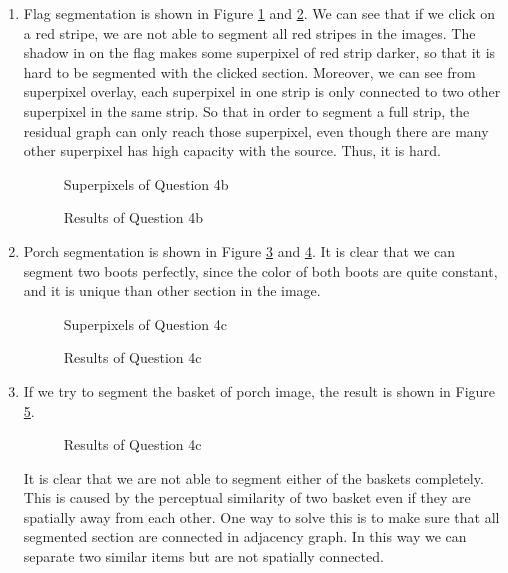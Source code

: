 \documentclass[12pt]{article}
\begin{document}
\begin{enumerate}
\begin{enumerate}
	\item Flag segmentation is shown in Figure \ref{fig:q4_2_1} and \ref{fig:q4_2_2}. We can see that if we click on a red stripe, we are not able to segment all red stripes in the images. The shadow in on the flag makes some superpixel of red strip darker, so that it is hard to be segmented with the clicked section. Moreover, we can see from superpixel overlay, each superpixel in one strip is only connected to two other superpixel in the same strip. So that in order to segment a full strip, the residual graph can only reach those superpixel, even though there are many other superpixel has high capacity with the source. Thus, it is hard.
	\begin{figure}[H]
		\centering{}
		\caption{Superpixels of Question 4b}
		\label{fig:q4_2_1}
	\end{figure}
	\begin{figure}[H]
		\centering{}
		\caption{Results of Question 4b}
		\label{fig:q4_2_2}
	\end{figure}

	\item Porch segmentation is shown in Figure \ref{fig:q4_3_1} and \ref{fig:q4_3_2}. It is clear that we can segment two boots perfectly, since the color of both boots are quite constant, and it is unique than other section in the image.
	\begin{figure}[H]
		\centering{}
		\caption{Superpixels of Question 4c}
		\label{fig:q4_3_1}
	\end{figure}
	\begin{figure}[H]
		\centering{}
		\caption{Results of Question 4c}
		\label{fig:q4_3_2}
	\end{figure}

	\item If we try to segment the basket of porch image, the result is shown in Figure \ref{fig:q4_4}. 
	\begin{figure}[H]
		\centering{}
		\caption{Results of Question 4c}
		\label{fig:q4_4}
	\end{figure}
	It is clear that we are not able to segment either of the baskets completely. This is caused by the perceptual similarity of two basket even if they are spatially away from each other. One way to solve this is to make sure that all segmented section are connected in adjacency graph. In this way we can separate two similar items but are not spatially connected.   
	
		
	\end{enumerate}
	\end{enumerate}
\pagebreak
\end{document}
